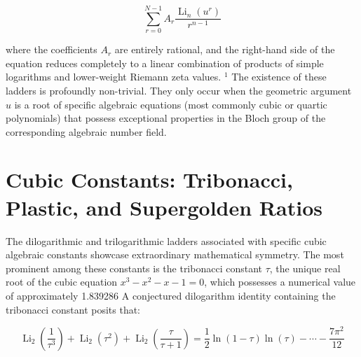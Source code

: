 \documentclass[10pt]{article}
\begin{document}
$$
\sum_{r=0}^{N-1} A_{r} \frac{\operatorname{Li}_{n}\left(u^{r}\right)}{r^{n-1}}
$$

where the coefficients $A_{r}$ are entirely rational, and the right-hand side of the equation reduces completely to a linear combination of products of simple logarithms and lower-weight Riemann zeta values. ${ }^{1}$ The existence of these ladders is profoundly non-trivial. They only occur when the geometric argument $u$ is a root of specific algebraic equations (most commonly cubic or quartic polynomials) that possess exceptional properties in the Bloch group of the corresponding algebraic number field.

\section*{Cubic Constants: Tribonacci, Plastic, and Supergolden Ratios}
The dilogarithmic and trilogarithmic ladders associated with specific cubic algebraic constants showcase extraordinary mathematical symmetry. The most prominent among these constants is the tribonacci constant $\tau$, the unique real root of the cubic equation $x^{3}-x^{2}-x-1=0$, which possesses a numerical value of approximately 1.839286 A conjectured dilogarithm identity containing the tribonacci constant posits that:

$$
\operatorname{Li}_{2}\left(\frac{1}{\tau^{3}}\right)+\operatorname{Li}_{2}\left(\tau^{2}\right)+\operatorname{Li}_{2}\left(\frac{\tau}{\tau+1}\right)=\frac{1}{2} \ln (1-\tau) \ln (\tau)-\cdots-\frac{7 \pi^{2}}{12}
$$
\end{document}
